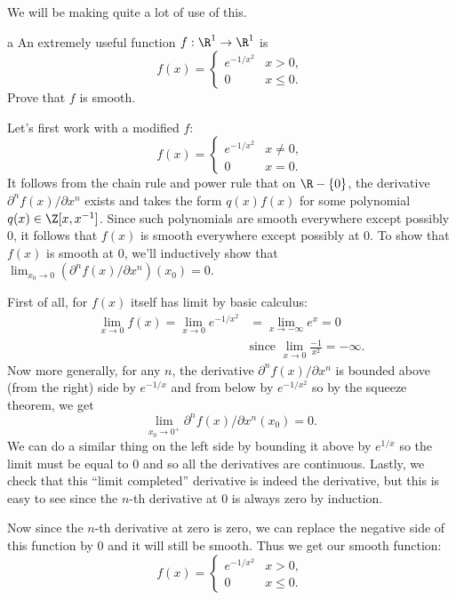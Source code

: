 \documentclass[11pt,letterpaper]{article}
\begin{document}
\begin{solution}
    We will be making quite a lot of use of this.
    \begin{partproblem}{a}
        An extremely useful function $f : \R^1 \to \R^1$ is
        \[
            f(x)=\begin{cases}
                e^{-1 /x^2} & x > 0,\\
                0 & x \leq 0.
            \end{cases}
        \]
        Prove that $f$ is smooth. 
    \end{partproblem}

    \quad Let's first work with a modified $f$:
    \[
        f(x)=\begin{cases}
            e^{-1 /x^2} & x\neq 0,\\
            0 &x= 0.
        \end{cases}
    \] 
    It follows from the chain rule and power rule that on $\R -\{0\}$, the derivative $\partial^n f(x) / \partial x^n$ exists and takes the form $q(x)f(x)$ for some polynomial $q(x)\in\Z[x, x^{-1}]$. Since such polynomials are smooth everywhere except possibly $0$, it follows that $f(x)$ is smooth everywhere except possibly at $0$. To show that $f(x)$ is smooth at $0$, we'll inductively show that $\lim_{x_0 \to 0}\left(\partial^n f(x) / \partial x^n\right)(x_0) = 0$.
    
    \quad First of all, for $f(x)$ itself has limit by basic calculus:
    \[
        \begin{aligned}
            \lim_{x \to 0} f(x) = \lim_{x\to 0} e^{-1 / x^2} &= \lim_{x\to -\infty} e^{x} = 0\\
            &\text{since } \lim_{x\to 0} \frac{-1}{x^2} = -\infty.
        \end{aligned}
    \] 
    Now more generally, for any $n$, the derivative $\partial^n f(x)/\partial x^n$ is bounded above (from the right) side by $e^{-1 /x}$ and from below by $e^{-1 /x^2}$ so by the squeeze theorem, we get
    \[
        \lim_{x_0 \to 0^+}\partial^n f(x)/\partial x^n(x_0) = 0
    .\]   
    We can do a similar thing on the left side by bounding it above by $e^{1 /x}$ so the limit must be equal to $0$ and so all the derivatives are continuous. Lastly, we check that this ``limit completed'' derivative is indeed the derivative, but this is easy to see since the $n$-th derivative at $0$ is always zero by induction.

    Now since the $n$-th derivative at zero is zero, we can replace the negative side of this function by $0$ and it will still be smooth. Thus we get our smooth function:
    \[
        f(x)=\begin{cases}
            e^{-1/x^2}& x>0,\\
            0 & x\leq 0.
        \end{cases}
    \] 


\end{solution}
\end{document}
